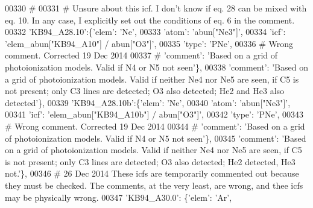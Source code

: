 \begin{DoxyCode}
00330 \textcolor{comment}{#}
00331 \textcolor{comment}{# Unsure about this icf. I don't know if eq. 28 can be mixed with eq. 10. In any case, I explicitly set out
       the conditions of eq. 6 in the comment.}
00332                          \textcolor{stringliteral}{'KB94\_A28.10'}:\{\textcolor{stringliteral}{'elem'}: \textcolor{stringliteral}{'Ne'},
00333                                      \textcolor{stringliteral}{'atom'}: \textcolor{stringliteral}{'abun["Ne3"]'},
00334                                      \textcolor{stringliteral}{'icf'}: \textcolor{stringliteral}{'elem\_abun["KB94\_A10"]  / abun["O3"]'},
00335                                       \textcolor{stringliteral}{'type'}: \textcolor{stringliteral}{'PNe'},
00336 \textcolor{comment}{# Wrong comment. Corrected 19 Dec 2014}
00337 \textcolor{comment}{#                                      'comment': 'Based on a grid of photoionization models. Valid if N4
       or N5 not seen'\},}
00338                                       \textcolor{stringliteral}{'comment'}: \textcolor{stringliteral}{'Based on a grid of photoionization models. Valid if
       neither Ne4 nor Ne5 are seen, if C5 is not present; only C3 lines are detected; O3 also detected; He2 and He3
       also detected'}\},
00339                          \textcolor{stringliteral}{'KB94\_A28.10b'}:\{\textcolor{stringliteral}{'elem'}: \textcolor{stringliteral}{'Ne'},
00340                                      \textcolor{stringliteral}{'atom'}: \textcolor{stringliteral}{'abun["Ne3"]'},
00341                                      \textcolor{stringliteral}{'icf'}: \textcolor{stringliteral}{'elem\_abun["KB94\_A10b"]  / abun["O3"]'},
00342                                       \textcolor{stringliteral}{'type'}: \textcolor{stringliteral}{'PNe'},
00343 \textcolor{comment}{# Wrong comment. Corrected 19 Dec 2014}
00344 \textcolor{comment}{#                                      'comment': 'Based on a grid of photoionization models. Valid if N4
       or N5 not seen'\},}
00345                                       \textcolor{stringliteral}{'comment'}: \textcolor{stringliteral}{'Based on a grid of photoionization models. Valid if
       neither Ne4 nor Ne5 are seen, if C5 is not present; only C3 lines are detected; O3 also detected; He2 detected,
       He3 not.'}\},
00346 \textcolor{comment}{# 26 Dec 2014 These icfs are temporarily commented out because they must be checked. The comments, at the
       very least, are wrong, and thee icfs may be physically wrong.  }
00347                          \textcolor{stringliteral}{'KB94\_A30.0'}: \{\textcolor{stringliteral}{'elem'}: \textcolor{stringliteral}{'Ar'},

\end{DoxyCode}
